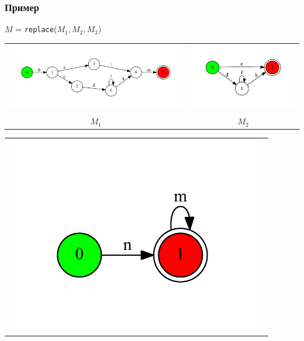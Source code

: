 \documentclass{beamer}
\begin{document}
\begin{frame}[fragile]
\transwipe[direction=90]
\frametitle{Пример}
$M$ = \verb|replace|($M_1, M_2, M_3$)

\begin{tabular}{c c}		
 	 \begin{minipage}{.6\textwidth} 
     \includegraphics[width=\linewidth]{fsa1}
     \end{minipage} 
     &
 	 \begin{minipage}{.3\textwidth} 
     \includegraphics[width=\linewidth]{fsa2}
     \end{minipage} \\
     $M_1$ & $M_2$ \\
     \end{tabular}
     \begin{tabular}{c c}	
 	 \begin{minipage}{.25\textwidth} 
     \includegraphics[width=\linewidth]{fsa3}

\end{minipage}
\end{tabular}
\end{frame}
\end{document}
